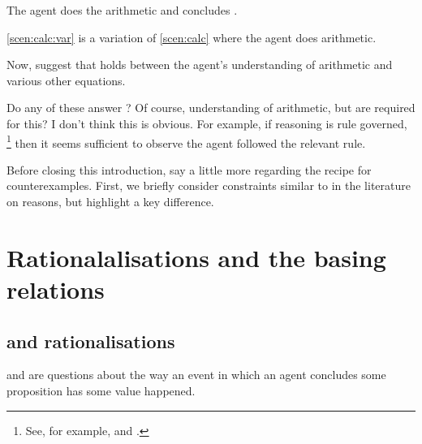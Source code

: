 \begin{note}
\begin{scenario}[Multiplication]
    The agent does the arithmetic and concludes \propM{\gistCalcEq{}}.
  \end{scenario}

  \noindent%
  \autoref{scen:calc:var} is a variation of \autoref{scen:calc} where the agent does arithmetic.

  Now, suggest that \ros{} holds between the agent's understanding of arithmetic and various other equations.

  Do any of these \ros{} answer \qWhy{}?
  Of course, understanding of arithmetic, but are \ros{} required for this?
  I don't think this is obvious.
  For example, if reasoning is rule governed,%
  \footnote{
    See, for example, \textcite{Boghossian:2008vf} and \textcite{Broome:2013aa}.
  }
  then it seems sufficient to observe the agent followed the relevant rule.
\end{note}

\begin{note}
  Before closing this introduction, say a little more regarding the recipe for counterexamples.
  First, we briefly consider constraints similar to \issueInclusion{} in the literature on reasons, but highlight a key difference.
\end{note}

\section*{Rationalalisations and the basing relations}

\subsection*{\issueInclusion{} and rationalisations}
\label{sec:reasons}

\begin{note}
  \qWhy{} and \qHow{} are questions about the way an event in which an agent concludes some proposition has some value happened.
\end{note}

